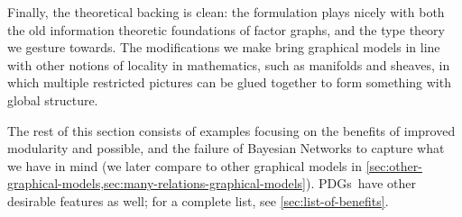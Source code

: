 \documentclass{article}
\newcommand{\MN}{PDG}
\newcommand{\MNs}{\MN s}
\begin{document}
	
	
	Finally, the theoretical backing is clean: the formulation plays nicely with both the old information theoretic foundations of factor graphs, and the type theory we gesture towards.
	The modifications we make bring graphical models in line with other notions of locality in mathematics, such as manifolds and sheaves, in which multiple restricted pictures can be glued together to form something with global structure.
	
	
	
	The rest of this section consists of examples focusing on the benefits of improved modularity and possible, and the failure of Bayesian Networks to capture what we have in mind (we later compare to other graphical models in \cref{sec:other-graphical-models,sec:many-relations-graphical-models}). \MNs\ have other desirable features as well; for a complete list, see \cref{sec:list-of-benefits}.
	
\end{document}
